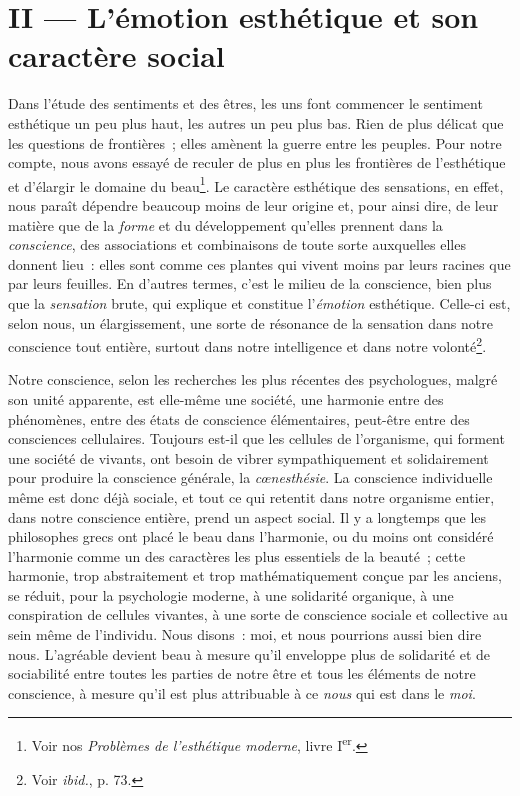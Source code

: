 \documentclass[french,twoside]{book} %
\begin{document}
\section[{II — L’émotion esthétique et son caractère social}]{II — L’émotion esthétique et son caractère social}
\noindent Dans l’étude des sentiments et des êtres, les uns font commencer le sentiment esthétique un peu plus haut, les autres un peu plus bas. Rien de plus délicat que les questions de frontières ; elles amènent la guerre entre les peuples. Pour notre compte, nous avons essayé de reculer de plus en plus les frontières de l’esthétique et d’élargir le domaine du beau\footnote{ Voir nos \emph{Problèmes de l’esthétique moderne}, livre I\textsuperscript{er}.}. Le caractère esthétique des sensations, en effet, nous paraît dépendre beaucoup moins de leur origine et, pour ainsi dire, de leur matière que de la \emph{forme} et du développement qu’elles prennent dans la \emph{conscience}, des associations et combinaisons de toute sorte auxquelles elles donnent lieu : elles sont comme ces plantes qui vivent moins par leurs racines que par leurs feuilles. En d’autres termes, c’est le milieu de la conscience, bien plus que la \emph{sensation} brute, qui explique et constitue l’\emph{émotion} esthétique. Celle-ci est, selon nous, un élargissement, une sorte de résonance de la sensation dans notre conscience tout entière, surtout dans notre intelligence et dans notre volonté\footnote{ Voir \emph{ibid.}, p. 73.}.\par
Notre conscience, selon les recherches les plus récentes des psychologues, malgré son unité apparente, est elle-même une société, une harmonie entre des phénomènes, entre des états de conscience élémentaires, peut-être entre des consciences cellulaires. Toujours est-il que les cellules de l’organisme, qui forment une société de vivants, ont besoin de vibrer sympathiquement et solidairement pour produire la conscience générale, la \emph{cœnesthésie}. La conscience individuelle même est donc déjà sociale, et tout ce qui retentit dans notre organisme entier, dans notre conscience entière, prend un aspect social. Il y a longtemps que les philosophes grecs ont placé le beau dans l’harmonie, ou du moins ont considéré l’harmonie comme un des caractères les plus essentiels de la beauté ; cette harmonie, trop abstraitement et trop mathématiquement conçue par les anciens, se réduit, pour la psychologie moderne, à une solidarité organique, à une conspiration de cellules vivantes, à une sorte de conscience sociale et collective au sein même de l’individu. Nous disons : moi, et nous pourrions aussi bien dire nous. L’agréable devient beau à mesure qu’il enveloppe plus de solidarité et de sociabilité entre toutes les parties de notre être et tous les éléments de notre conscience, à mesure qu’il est plus attribuable à ce \emph{nous} qui est dans le \emph{moi}.\par
\end{document}
